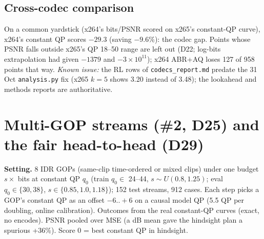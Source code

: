 \documentclass[10pt,a4paper]{article}
\newcommand{\code}[1]{\texttt{\small #1}}
\begin{document}
\subsection{Cross-codec comparison}
On a common yardstick (x264's bits/PSNR scored on x265's constant-QP curve), x264's constant QP scores $-29.3$ (saving
$-9.6$\%): the codec gap. Points whose PSNR falls outside x265's QP 18--50 range are left out (D22; log-bits
extrapolation had given $-1379$ and $-3\times10^{11}$); x264 ABR+AQ loses 127 of 958 points that way.
\emph{Known issue:} the RL rows of \code{codecs\_report.md} predate the 31 Oct \code{analysis.py} fix (x265 $k=5$ shows
3.20 instead of 3.48); the lookahead and methods reports are authoritative.

\section{Multi-GOP streams (\#2, D25) and the fair head-to-head (D29)}
\textbf{Setting.} 8 IDR GOPs (same-clip time-ordered or mixed clips) under one budget $s\times$ bits at constant QP
$q_0$ (train $q_0\in$ 24--44, $s\sim U(0.8,1.25)$; eval $q_0\in\{30,38\}$, $s\in\{0.85,1.0,1.18\}$); 152 test streams,
912 cases. Each step picks a GOP's constant QP as an offset $-6..+6$ on a causal model QP (5.5 QP per doubling,
online calibration). Outcomes from the real constant-QP curves (exact, no encodes). PSNR pooled over MSE (a dB mean
gave the hindsight plan a spurious +36\%). Score 0 = best constant QP in hindsight.
\end{document}
